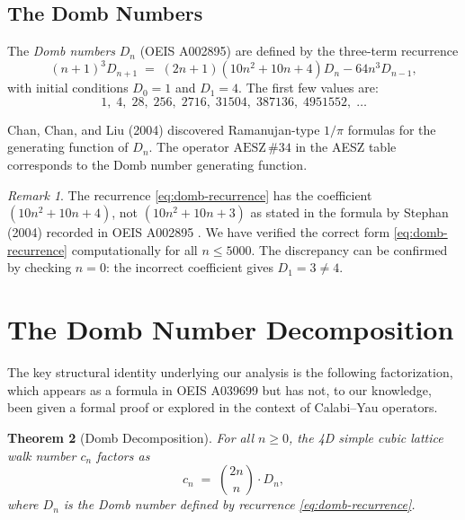\documentclass[12pt,a4paper]{article}
\numberwithin{equation}{section}
\theoremstyle{plain}
\newtheorem{theorem}{Theorem}[section]
\theoremstyle{definition}
\theoremstyle{remark}
\newtheorem{remark}[theorem]{Remark}
\newcommand{\aesz}[1]{\mathrm{AESZ}\,\#\!{#1}}
\begin{document}
\subsection{The Domb Numbers}

The \emph{Domb numbers} $D_n$ (OEIS A002895) are defined by the three-term recurrence
\begin{equation}\label{eq:domb-recurrence}
  (n+1)^3 D_{n+1} \;=\; (2n+1)(10n^2 + 10n + 4) D_n - 64 n^3 D_{n-1},
\end{equation}
with initial conditions $D_0 = 1$ and $D_1 = 4$. The first few values are:
\begin{equation}\label{eq:domb-values}
  1,\; 4,\; 28,\; 256,\; 2716,\; 31504,\; 387136,\; 4951552,\; \ldots
\end{equation}

Chan, Chan, and Liu (2004) \cite{ChanChanLiu2004} discovered Ramanujan-type $1/\pi$ formulas for the
generating function of $D_n$. The operator $\aesz{34}$ in the AESZ table corresponds to the
Domb number generating function.

\begin{remark}\label{rem:domb-coeff}
The recurrence \eqref{eq:domb-recurrence} has the coefficient $(10n^2 + 10n + 4)$, not $(10n^2 + 10n + 3)$
as stated in the formula by Stephan (2004) recorded in OEIS A002895 \cite{OEIS}.
We have verified the correct form \eqref{eq:domb-recurrence} computationally for all $n \leq 5000$.
The discrepancy can be confirmed by checking $n = 0$: the incorrect coefficient gives
$D_1 = 3 \neq 4$.
\end{remark}

\section{The Domb Number Decomposition}\label{sec:domb}

The key structural identity underlying our analysis is the following factorization,
which appears as a formula in OEIS A039699 \cite{OEIS} but has not, to our knowledge,
been given a formal proof or explored in the context of Calabi--Yau operators.

\begin{theorem}[Domb Decomposition]\label{thm:domb-decomposition}
  For all $n \geq 0$, the 4D simple cubic lattice walk number $c_n$ factors as
  \begin{equation}\label{eq:domb-decomposition}
    c_n \;=\; \binom{2n}{n} \cdot D_n,
  \end{equation}
  where $D_n$ is the Domb number defined by recurrence \eqref{eq:domb-recurrence}.
\end{theorem}
\end{document}
